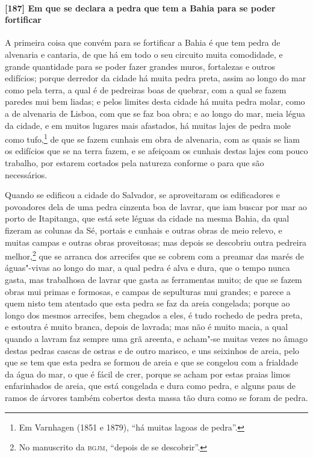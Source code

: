\begin{linenumbers}
\paragraph{[187] Em que se declara a pedra que tem a Bahia para se poder fortificar}\quad
A primeira coisa que convém para se fortificar a Bahia é que tem pedra de alvenaria e
cantaria, de que há em todo o seu circuito muita comodidade, e grande quantidade para se
poder fazer grandes muros, fortalezas e outros edifícios; porque derredor da cidade há
muita pedra preta, assim ao longo do mar como pela terra, a qual é de pedreiras boas de
quebrar, com a qual se fazem paredes mui bem liadas; e pelos limites desta cidade há muita
pedra molar, como a de alvenaria de Lisboa, com que se faz boa obra; e ao longo do mar,
meia légua da cidade, e em muitos lugares mais afastados, há muitas lajes de pedra mole
como tufo,\footnote{ Em Varnhagen (1851 e 1879), ``há muitas lagoas de pedra''.} de que se
fazem cunhais em obra de alvenaria, com as quais se liam os edifícios que se na terra
fazem, e se afeiçoam os cunhais destas lajes com pouco trabalho, por estarem cortados pela
natureza conforme o para que são necessários.

Quando se edificou a cidade do Salvador, se aproveitaram os edificadores e povoadores dela
de uma pedra cinzenta boa de lavrar, que iam buscar por mar ao porto de Itapitanga, que
está sete léguas da cidade na mesma Bahia, da qual fizeram as colunas da Sé, portais e
cunhais e outras obras de meio relevo, e muitas campas e outras obras proveitosas; mas
depois se descobriu outra pedreira melhor,\footnote{ No manuscrito da \textsc{bgjm},
``depois de se descobrir''.} que se arranca dos arrecifes que se cobrem com a preamar das
marés de águas"-vivas ao longo do mar, a qual pedra é alva e dura, que o tempo nunca gasta,
mas trabalhosa de lavrar que gasta as ferramentas muito; de que se fazem obras mui primas
e formosas, e campas de sepulturas mui grandes; e parece a quem nisto tem atentado que
esta pedra se faz da areia congelada; porque ao longo dos mesmos arrecifes, bem chegados a
eles, é tudo rochedo de pedra preta, e estoutra é muito branca, depois de lavrada; mas não
é muito macia, a qual quando a lavram faz sempre uma grã areenta, e acham"-se muitas vezes
no âmago destas pedras cascas de ostras e de outro marisco, e uns seixinhos de areia, pelo
que se tem que esta pedra se formou de areia e que se congelou com a frialdade da água do
mar, o que é fácil de crer, porque se acham por estas praias limos enfarinhados de areia,
que está congelada e dura como pedra, e alguns paus de ramos de árvores também cobertos
desta massa tão dura como se foram de pedra.


\end{linenumbers}
